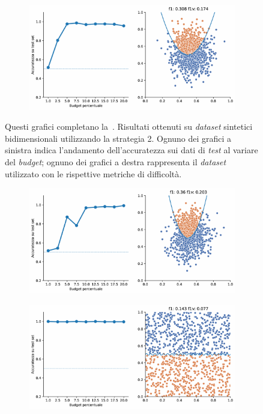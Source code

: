 \begin{appendices}
\begin{figure}[b!]
\begin{subfigure}{.8\textwidth}
        \centering
        \includegraphics[width=\textwidth]{img/2d_v2/3.pdf}
    \end{subfigure}
    \caption[Risultati su \emph{dataset} sintetici utilizzando la strategia 2.]{Questi grafici completano la~. Risultati ottenuti su \emph{dataset} sintetici bidimensionali utilizzando la strategia 2. Ognuno dei grafici a sinistra indica l'andamento dell'accuratezza sui dati di \emph{test} al variare del \emph{budget}; ognuno dei grafici a destra rappresenta il \emph{dataset} utilizzato con le rispettive metriche di difficoltà.}
\end{figure}
\begin{figure}[ht]\ContinuedFloat
    \centering
    \begin{subfigure}{.8\textwidth}
        \centering
        \includegraphics[width=\textwidth]{img/2d_v2/5.pdf}
    \end{subfigure}%
    \hfill
    \begin{subfigure}{.8\textwidth}
        \centering
        \includegraphics[width=\textwidth]{img/2d_v2/6.pdf}

\end{subfigure}
\end{figure}
\end{appendices}
